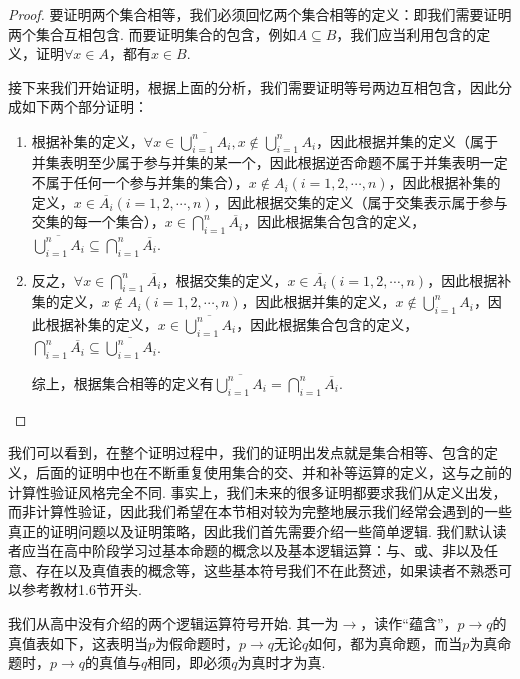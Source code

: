 \begin{proof}
    要证明两个集合相等，我们必须回忆两个集合相等的定义：即我们需要证明两个集合互相包含. 而要证明集合的包含，例如$A\subseteq B$，我们应当利用包含的定义，证明$\forall x\in A$，都有$x\in B$.

    接下来我们开始证明，根据上面的分析，我们需要证明等号两边互相包含，因此分成如下两个部分证明：
    \begin{enumerate}
        \item 根据补集的定义，$\forall x\in \overline{\bigcup\limits_{i=1}^nA_i},x\notin \bigcup\limits_{i=1}^nA_i$，因此根据并集的定义（属于并集表明至少属于参与并集的某一个，因此根据逆否命题不属于并集表明一定不属于任何一个参与并集的集合），$x\notin A_i(i=1,2,\cdots,n)$，因此根据补集的定义，$x\in \overline{A_i}(i=1,2,\cdots,n)$，因此根据交集的定义（属于交集表示属于参与交集的每一个集合），$x\in \bigcap\limits_{i=1}^n\overline{A_i}$，因此根据集合包含的定义，$\overline{\bigcup\limits_{i=1}^nA_i}\subseteq \bigcap\limits_{i=1}^n\overline{A_i}$.

        \item 反之，$\forall x\in \bigcap\limits_{i=1}^n\overline{A_i}$，根据交集的定义，$x\in \overline{A_i}(i=1,2,\cdots,n)$，因此根据补集的定义，$x\notin A_i(i=1,2,\cdots,n)$，因此根据并集的定义，$x\notin \bigcup\limits_{i=1}^nA_i$，因此根据补集的定义，$x\in \overline{\bigcup\limits_{i=1}^nA_i}$，因此根据集合包含的定义，$\bigcap\limits_{i=1}^n\overline{A_i}\subseteq \overline{\bigcup\limits_{i=1}^nA_i}$.

        综上，根据集合相等的定义有$\overline{\bigcup\limits_{i=1}^nA_i}=\bigcap\limits_{i=1}^n\overline{A_i}$.
    \end{enumerate}
\end{proof}

我们可以看到，在整个证明过程中，我们的证明出发点就是集合相等、包含的定义，后面的证明中也在不断重复使用集合的交、并和补等运算的定义，这与之前的计算性验证风格完全不同. 事实上，我们未来的很多证明都要求我们从定义出发，而非计算性验证，因此我们希望在本节相对较为完整地展示我们经常会遇到的一些真正的证明问题以及证明策略，因此我们首先需要介绍一些简单逻辑. 我们默认读者应当在高中阶段学习过基本命题的概念以及基本逻辑运算：与、或、非以及任意、存在以及真值表的概念等，这些基本符号我们不在此赘述，如果读者不熟悉可以参考教材1.6节开头.

我们从高中没有介绍的两个逻辑运算符号开始. 其一为$\to$，读作``蕴含''，$p\to q$的真值表如下，这表明当$p$为假命题时，$p\to q$无论$q$如何，都为真命题，而当$p$为真命题时，$p\to q$的真值与$q$相同，即必须$q$为真时才为真.


